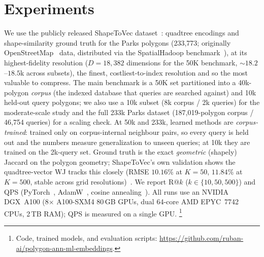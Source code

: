 \documentclass[sigconf]{acmart}
\begin{document}
\section{Experiments}
\label{sec:exp}
We use the publicly released ShapeToVec dataset~\cite{shapetovec-data}: quadtree
encodings and shape-similarity ground truth for the Parks polygons (233{,}773;
originally OpenStreetMap~\cite{osm} data, distributed via the SpatialHadoop
benchmark~\cite{eldawy15}), at its highest-fidelity resolution
($D{=}18{,}382$ dimensions for the 50K benchmark, ${\sim}18.2$--$18.5$k across
subsets), the finest, costliest-to-index resolution and so the most valuable to
compress. The main benchmark is a 50K set partitioned into a 40k-polygon \emph{corpus}
(the indexed database that queries are searched against) and 10k held-out query
polygons; we also use a 10k subset (8k corpus / 2k queries) for the moderate-scale
study and the full 233k Parks dataset (187,019-polygon corpus / 46{,}754 queries) for
a scaling check. At 50k and 233k, learned methods are \emph{corpus-trained}: trained only on
corpus-internal neighbour pairs, so every query is held out and the numbers measure
generalization to unseen queries; at 10k they are trained on the 2k-query set. Ground
truth is the exact \emph{geometric} (shapely) Jaccard on the polygon geometry;
ShapeToVec's own validation shows the quadtree-vector WJ tracks this closely (RMSE
$10.16\%$ at $K{=}50$, $11.84\%$ at $K{=}500$, stable across grid
resolutions)~\cite{shape2vec}. We report R@$k$ ($k\in\{10,50,500\}$) and QPS (PyTorch~\cite{paszke19},
AdamW~\cite{loshchilov19}, cosine annealing~\cite{loshchilov17}). All runs use an
NVIDIA DGX~A100 (8$\times$ A100-SXM4 80\,GB GPUs, dual 64-core AMD EPYC~7742 CPUs,
2\,TB RAM); QPS is measured on a single GPU. \footnote{Code, trained models, and
evaluation scripts: \url{https://github.com/ruban-ai/polygon-ann-ml-embeddings}.}
\end{document}
